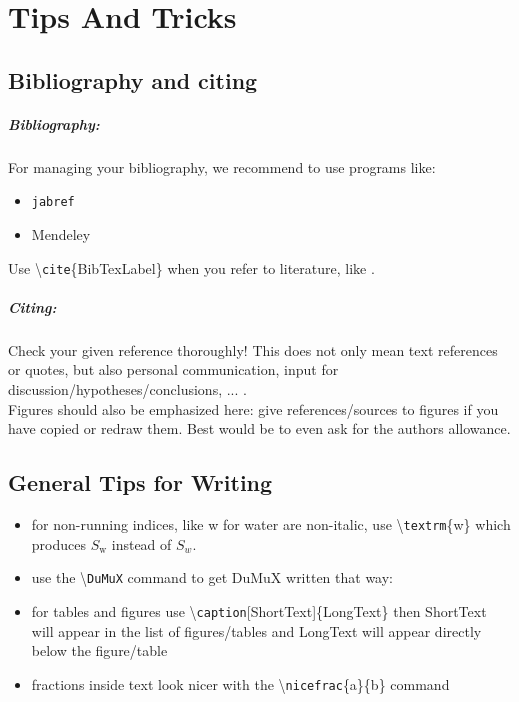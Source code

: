 \chapter{Tips And Tricks}
\thispagestyle{empty}

\newcommand{\examplecommand}[1]{\textbackslash\texttt{#1}}
\newcommand{\examplespace}[1]{\hspace{2cm}}

\section{Bibliography and citing}
\paragraph*{Bibliography:} For managing your bibliography, we recommend to use programs like:
\begin{itemize}
  \item \texttt{jabref}
  \item Mendeley
\end{itemize}
Use \examplecommand{cite}\{BibTexLabel\} when you refer to literature, like \cite{Bear1988,Flemisch2011,Dreybrodt1996}.
\paragraph*{Citing:} Check your given reference thoroughly! This does not only
mean text references or quotes, but also personal communication, input for
discussion/hypotheses/conclusions, ... .\\
Figures should also be emphasized
here: give references/sources to figures if you have copied or redraw them. Best would
be to even ask for the authors allowance.

\section{General Tips for Writing}
\begin{itemize}
  \item for non-running indices, like w for water are non-italic, use \examplecommand{textrm}\{w\}
        which produces $S_\textrm{w}$ instead of $S_w$.
  \item use the \examplecommand{DuMuX} command to get DuMuX written that way: \DuMuX
  \item for tables and figures use \examplecommand{caption}[ShortText]\{LongText\}
        then ShortText will appear in the list of figures/tables
        and LongText will appear directly below the figure/table
  \item fractions inside text look nicer with the \examplecommand{nicefrac}\{a\}\{b\}
        command 
\end{itemize}

